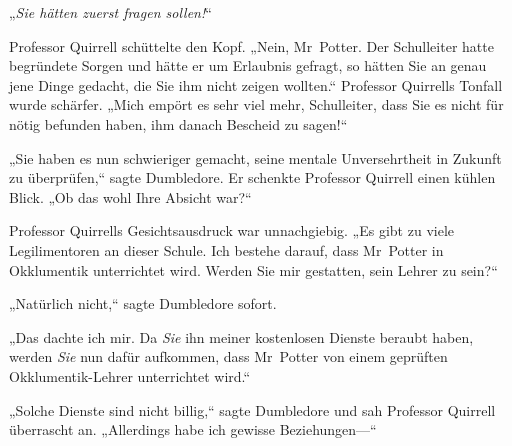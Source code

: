 „\emph{Sie hätten zuerst fragen sollen!}“

Professor Quirrell schüttelte den Kopf. „Nein, Mr~Potter. Der Schulleiter hatte begründete Sorgen und hätte er um Erlaubnis gefragt, so hätten Sie an genau jene Dinge gedacht, die Sie ihm nicht zeigen wollten.“ Professor Quirrells Tonfall wurde schärfer. „Mich empört es sehr viel mehr, Schulleiter, dass Sie es nicht für nötig befunden haben, ihm danach Bescheid zu sagen!“

„Sie haben es nun schwieriger gemacht, seine mentale Unversehrtheit in Zukunft zu überprüfen,“ sagte Dumbledore. Er schenkte Professor Quirrell einen kühlen Blick. „Ob das wohl Ihre Absicht war?“

Professor Quirrells Gesichtsausdruck war unnachgiebig. „Es gibt zu viele Legilimentoren an dieser Schule. Ich bestehe darauf, dass Mr~Potter in Okklumentik unterrichtet wird. Werden Sie mir gestatten, sein Lehrer zu sein?“

„Natürlich nicht,“ sagte Dumbledore sofort.

„Das dachte ich mir. Da \emph{Sie} ihn meiner kostenlosen Dienste beraubt haben, werden \emph{Sie} nun dafür aufkommen, dass Mr~Potter von einem geprüften Okklumentik-Lehrer unterrichtet wird.“

„Solche Dienste sind nicht billig,“ sagte Dumbledore und sah Professor Quirrell überrascht an. „Allerdings habe ich gewisse Beziehungen—“


